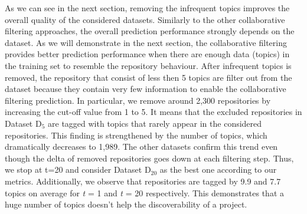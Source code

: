 As we can see in the next section, removing the infrequent topics improves the overall quality of the considered datasets. 
Similarly to the other collaborative filtering approaches, the overall prediction performance strongly depends on the dataset. As we will demonstrate in the next section, the collaborative filtering provides better prediction performance when there are enough data (\ie topics) in the training set to resemble the repository behaviour. After infrequent topics is removed, the repository that consist of less then 5 topics are filter out from the dataset because they contain very few information to enable the collaborative filtering prediction. In particular, we remove around 2,300 repositories by increasing the cut-off value from 1 to 5. It means that the excluded repositories in Dataset D$_5$ are tagged with topics that rarely appear in the considered repositories. This finding is strengthened by the number of topics, which dramatically decreases to 1,989. The other datasets confirm this trend even though the delta of removed repositories goes down at each filtering step. Thus, we stop at t=20 and consider Dataset D$_{20}$ as the best one according to our metrics. Additionally, we observe that repositories are tagged by 9.9 and 7.7 topics on average for \emph{t} = 1 and \emph{t} = 20 respectively. This demonstrates that a huge number of topics doesn't help the discoverability of a project.

